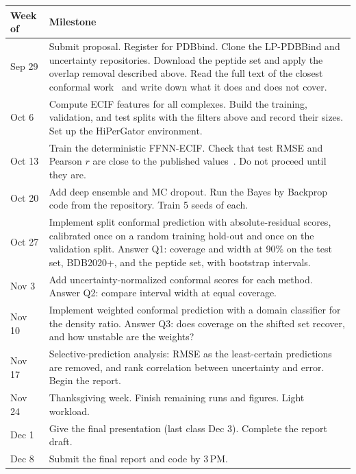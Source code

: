 \documentclass[11pt]{article}
\begin{document}
\begin{center}
\begin{tabular}{@{}>{\raggedright\arraybackslash}p{1.6cm}>{\raggedright\arraybackslash}p{13.6cm}@{}}
  \toprule
  Week of & Milestone \\
  \midrule
  Sep 29 & Submit proposal. Register for PDBbind. Clone the LP-PDBBind and uncertainty repositories. Download the peptide set and apply the overlap removal described above. Read the full text of the closest conformal work~\cite{parks2020,orsolic2023,codrug2023} and write down what it does and does not cover. \\
  Oct 6  & Compute ECIF features for all complexes. Build the training, validation, and test splits with the filters above and record their sizes. Set up the HiPerGator environment. \\
  Oct 13 & Train the deterministic FFNN-ECIF. Check that test RMSE and Pearson $r$ are close to the published values~\cite{rayka2025}. Do not proceed until they are. \\
  Oct 20 & Add deep ensemble and MC dropout. Run the Bayes by Backprop code from the repository. Train 5 seeds of each. \\
  Oct 27 & Implement split conformal prediction with absolute-residual scores, calibrated once on a random training hold-out and once on the validation split. Answer Q1: coverage and width at 90\% on the test set, BDB2020+, and the peptide set, with bootstrap intervals. \\
  Nov 3  & Add uncertainty-normalized conformal scores for each method. Answer Q2: compare interval width at equal coverage. \\
  Nov 10 & Implement weighted conformal prediction with a domain classifier for the density ratio. Answer Q3: does coverage on the shifted set recover, and how unstable are the weights? \\
  Nov 17 & Selective-prediction analysis: RMSE as the least-certain predictions are removed, and rank correlation between uncertainty and error. Begin the report. \\
  Nov 24 & Thanksgiving week. Finish remaining runs and figures. Light workload. \\
  Dec 1  & Give the final presentation (last class Dec 3). Complete the report draft. \\
  Dec 8  & Submit the final report and code by 3\,PM. \\
  \bottomrule
\end{tabular}
\end{center}
\end{document}
